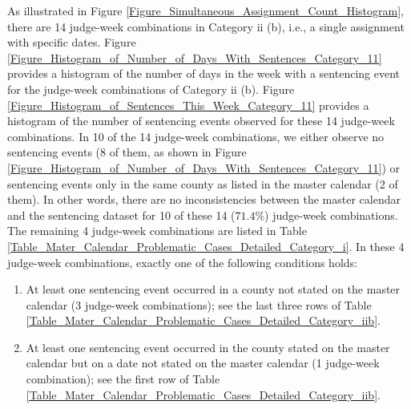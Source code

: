 \documentclass[11pt, oneside]{article}   	%
\theoremstyle{ModifiedStyle}
\begin{document}
As illustrated in Figure \ref{Figure_Simultaneous_Assignment_Count_Histogram}, there are 14 judge-week combinations in Category ii (b), i.e., a single assignment with specific dates. Figure \ref{Figure_Histogram_of_Number_of_Days_With_Sentences_Category_11} provides a histogram of the number of days in the week with a sentencing event for the judge-week combinations of Category ii (b). Figure \ref{Figure_Histogram_of_Sentences_This_Week_Category_11} provides a histogram of the number of sentencing events observed for these 14 judge-week combinations. In 10 of the 14 judge-week combinations, we either observe no sentencing events (8 of them, as shown in Figure \ref{Figure_Histogram_of_Number_of_Days_With_Sentences_Category_11}) or sentencing events only in the same county as listed in the master calendar (2 of them). In other words, there are no inconsistencies between the master calendar and the sentencing dataset for 10 of these 14 ($71.4\%$) judge-week combinations. The remaining 4 judge-week combinations are listed in Table \ref{Table_Mater_Calendar_Problematic_Cases_Detailed_Category_i}. In these 4 judge-week combinations, exactly one of the following conditions holds:
\begin{enumerate}
	\vspace{-3mm}
	\item At least one sentencing event occurred in a county not stated on the master calendar (3 judge-week combinations); see the last three rows of Table \ref{Table_Mater_Calendar_Problematic_Cases_Detailed_Category_iib}.
	\vspace{-2mm}
	\item At least one sentencing event occurred in the county stated on the master calendar but on a date not stated on the master calendar (1 judge-week combination); see the first row of Table \ref{Table_Mater_Calendar_Problematic_Cases_Detailed_Category_iib}.
\end{enumerate}
\end{document}
